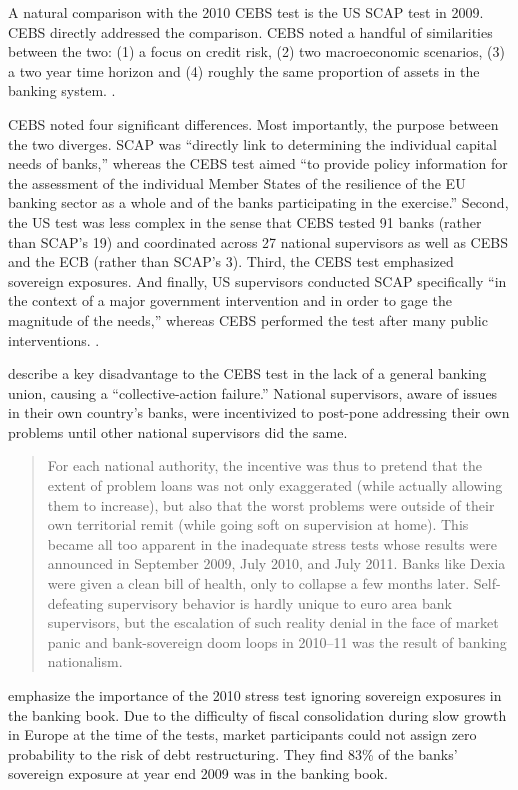 \documentclass[12pt]{article}
\begin{document}
A natural comparison with the 2010 CEBS test is the US SCAP test in 2009. CEBS directly addressed the comparison. CEBS noted a handful of similarities between the two: (1) a focus on credit risk, (2) two macroeconomic scenarios, (3) a two year time horizon and (4) roughly the same proportion of assets in the banking system. \citep{QA}.

CEBS noted four significant differences. Most importantly, the purpose between the two diverges. SCAP was ``directly link to determining the individual capital needs of banks,'' whereas the CEBS test aimed ``to provide policy information for the assessment of the individual Member States of the resilience of the EU banking sector as a whole and of the banks participating in the exercise.'' Second, the US test was less complex in the sense that CEBS tested 91 banks (rather than SCAP's 19) and coordinated across 27 national supervisors as well as CEBS and the ECB (rather than SCAP's 3). Third, the CEBS test emphasized sovereign exposures. And finally, US supervisors conducted SCAP specifically ``in the context of a major government intervention and in order to gage the magnitude of the needs,'' whereas CEBS performed the test after many public interventions. \citep{QA}.

\citet{Posen} describe a key disadvantage to the CEBS test in the lack of a general banking union, causing a ``collective-action failure.'' National supervisors, aware of issues in their own country's banks, were incentivized to post-pone addressing their own problems until other national supervisors did the same.

\begin{quote}
For each national authority, the incentive was thus to pretend that the extent of problem loans was not only exaggerated (while actually allowing them to increase), but also that the worst problems were outside of their own territorial remit (while going soft on supervision at home). This became all too apparent in the inadequate stress tests whose results were announced in September 2009, July 2010, and July 2011. Banks like Dexia were given a clean bill of health, only to collapse a few months later. Self-defeating supervisory behavior is hardly unique to euro area bank supervisors, but the escalation of such reality denial in the face of market panic and bank-sovereign doom loops in 2010–11 was the result of banking nationalism.
\end{quote}

\citet{OECD} emphasize the importance of the 2010 stress test ignoring sovereign exposures in the banking book. Due to the difficulty of fiscal consolidation during slow growth in Europe at the time of the tests, market participants could not assign zero probability to the risk of debt restructuring. They find 83\% of the banks' sovereign exposure at year end 2009 was in the banking book.
\end{document}
